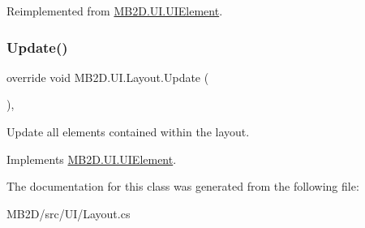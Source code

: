 Reimplemented from \hyperlink{class_m_b2_d_1_1_u_i_1_1_u_i_element_afec98e6e38cb0dbc17a5db6d6a3d5ba5}{M\+B2\+D.\+U\+I.\+U\+I\+Element}.

\hypertarget{class_m_b2_d_1_1_u_i_1_1_layout_a88af7d81c8eecdca29c04e2616b69c0c}{}\label{class_m_b2_d_1_1_u_i_1_1_layout_a88af7d81c8eecdca29c04e2616b69c0c} 
\subsubsection{\texorpdfstring{Update()}{Update()}}
{\footnotesize\ttfamily override void M\+B2\+D.\+U\+I.\+Layout.\+Update (\begin{DoxyParamCaption}{ }\end{DoxyParamCaption})\hspace{0.3cm}{\ttfamily [inline]}, {\ttfamily [virtual]}}



Update all elements contained within the layout. 



Implements \hyperlink{class_m_b2_d_1_1_u_i_1_1_u_i_element_aa97bcbe44f3fac8a13e2febca23b2d4d}{M\+B2\+D.\+U\+I.\+U\+I\+Element}.



The documentation for this class was generated from the following file\+:\begin{DoxyCompactItemize}
\item 
M\+B2\+D/src/\+U\+I/Layout.\+cs\end{DoxyCompactItemize}
